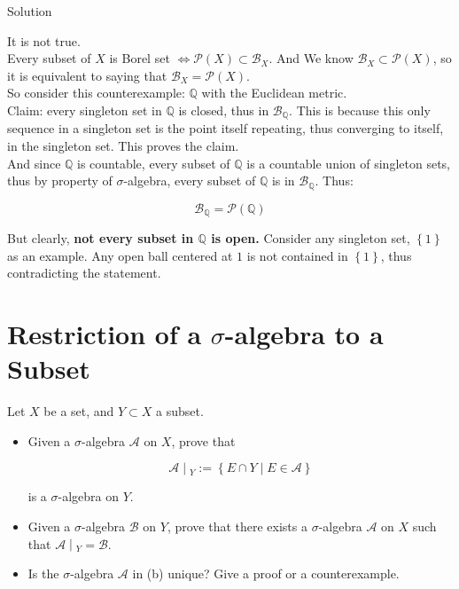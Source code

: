 \documentclass{qlnotes-export}
\begin{document}
\begin{qlsolution}{Solution}

It is not true.\\
Every subset of \(X\) is Borel set \(\Leftrightarrow\mathcal{P}(X) \subset \mathcal{B}_{X}\). And We know \(\mathcal{B}_{X} \subset \mathcal{P}(X)\), so it is equivalent to saying that \(\mathcal{B}_{X} = \mathcal{P}(X)\).\\
So consider this counterexample: \(\mathbb{Q}\) with the Euclidean metric.\\
Claim: every singleton set in \(\mathbb{Q}\) is closed, thus in \(\mathcal{B}_{\mathbb{Q}}\). This is because this only sequence in a singleton set is the point itself repeating, thus converging to itself, in the singleton set. This proves the claim.\\
And since \(\mathbb{Q}\) is countable, every subset of \(\mathbb{Q}\) is a countable union of singleton sets, thus by property of \(\sigma\)-algebra, every subset of \(\mathbb{Q}\) is in \(\mathcal{B}_{\mathbb{Q}}\). Thus:

\[\mathcal{B}_{\mathbb{Q}} = \mathcal{P}({\mathbb{Q}})\]

But clearly, \textbf{not every subset in \(\mathbb{Q}\) is open.} Consider any singleton set, \(\left\{ 1 \right\}\) as an example. Any open ball centered at \(1\) is not contained in \(\left\{ 1 \right\}\), thus contradicting the statement.

\end{qlsolution}

\section{\texorpdfstring{Restriction of a \(\sigma\)-algebra to a Subset}{Restriction of a \textbackslash sigma-algebra to a Subset}}\label{restriction-of-a-sigma-algebra-to-a-subset}

Let \(X\) be a set, and \(Y \subset X\) a subset.

\begin{itemize}
\item
  Given a \(\sigma\)-algebra \(\mathcal{A}\) on \(X\), prove that

  \[\left. \mathcal{A} \middle| {}_{Y} := \left\{ {E \cap Y \mid E \in \mathcal{A}} \right\} \right.\]

  is a \(\sigma\)-algebra on \(Y\).
\item
  Given a \(\sigma\)-algebra \(\mathcal{B}\) on \(Y\), prove that there exists a \(\sigma\)-algebra \(\mathcal{A}\) on \(X\) such that \(\left. \mathcal{A} \middle| {}_{Y} = \mathcal{B} \right.\).
\item
  Is the \(\sigma\)-algebra \(\mathcal{A}\) in (b) unique? Give a proof or a counterexample.
\end{itemize}
\end{document}
